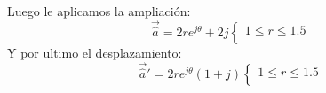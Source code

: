 Luego le aplicamos la ampliación:
\begin{equation}
    \vec{\hat{a}}=2re^{j\theta}+2j\begin{cases}
        1\leq r\leq1.5\\
    \end{cases}
\end{equation}
Y por ultimo el desplazamiento:
\begin{equation}
     \vec{\hat{a}}'=2re^{j\theta}(1+j)\begin{cases}
        1\leq r\leq1.5\\
    \end{cases}
\end{equation}
\begin{figure}[H]
    \centering
    \begin{minipage}{0.29\textwidth}
    \centering
        
        \label{fig:LinRotF}
    \end{minipage}
    \begin{minipage}{0.29\textwidth}
    \centering
        
        \label{fig:LinAmpF}
    \end{minipage}
    \begin{minipage}{0.29\textwidth}
    \centering
        
        \label{fig:LinDesF}
    \end{minipage}
    \caption{}
\end{figure}
\begin{figure}[H]
    \centering
    
    \label{fig:}
\end{figure}